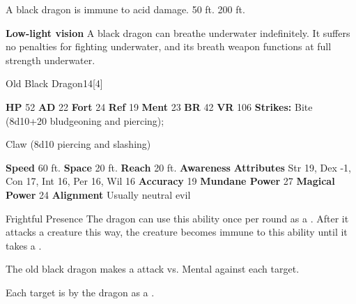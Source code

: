       
       A black dragon is immune to acid damage.
     50 ft.
     200 ft.
    \par\noindent\textbf{Low-light vision}
        A black dragon can breathe underwater indefinitely.
        It suffers no penalties for fighting underwater, and its breath weapon functions at full strength underwater.
  

  \begin{monsubsection}{Old Black Dragon}{14}[4]
    \vspace{-1em}\vspace{-1em}
    \vspace{0em}

    
    

    \begin{spellcontent}
      \begin{spelltargetinginfo}
        \pari \textbf{HP} 52 \monsep
          \textbf{AD} 22 \monsep
          \textbf{Fort} 24 \monsep
          \textbf{Ref} 19 \monsep
          \textbf{Ment} 23
        \pari \textbf{BR} 42 \monsep
        \textbf{VR} 106
        \pari \textbf{Strikes:}
            Bite  (8d10+20 bludgeoning and piercing);
\par Claw  (8d10 piercing and slashing)
      \end{spelltargetinginfo}
    \end{spellcontent}
    \begin{monsterfooter}
      \pari \textbf{Speed} 60 ft. \monsep
        \textbf{Space} 20 ft. \monsep
        \textbf{Reach} 20 ft.
      \pari \textbf{Awareness} 
      \pari \textbf{Attributes}
        Str 19, Dex -1,
        Con 17, Int 16,
        Per 16, Wil 16
      \pari \textbf{Accuracy} 19 \monsep
        \textbf{Mundane Power} 27 \monsep
      \textbf{Magical Power} 24
      \pari \textbf{Alignment} Usually neutral evil
    \end{monsterfooter}
  \end{monsubsection}
  \begin{freeability}{Frightful Presence}
      The dragon can use this ability once per round as a .
      After it attacks a creature this way, the creature becomes immune to this ability until it takes a .
      \par The old black dragon makes a  attack
        vs. Mental against each target.
    
    \hit Each target is  by the dragon as a .
    \end{freeability}
  

